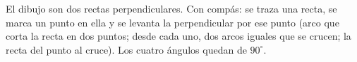 \documentclass[11pt]{article}
\begin{document}
\begin{preguntas}
\begin{solucion}[5cm]
El dibujo son dos rectas perpendiculares. Con compás: se traza una recta, se marca un punto en
ella y se levanta la perpendicular por ese punto (arco que corta la recta en dos puntos; desde
cada uno, dos arcos iguales que se crucen; la recta del punto al cruce). Los cuatro ángulos
quedan de $90^\circ$.
\end{solucion}

\end{preguntas}
\end{document}
